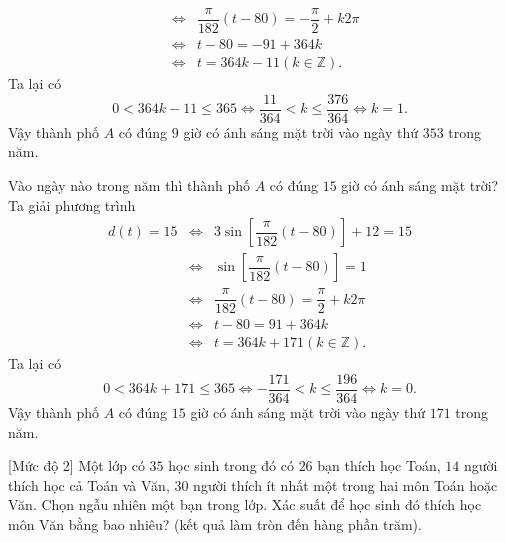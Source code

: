\begin{bt}
{\begin{listEX}[1]
\begin{eqnarray*}
				&\Leftrightarrow& \dfrac{\pi}{182}(t-80) =-\dfrac{\pi}{2}+k2 \pi \\
				&\Leftrightarrow& t-80 = -91+364k\\
				&\Leftrightarrow& t= 364k-11 (k\in \mathbb{Z}).	
			\end{eqnarray*}
			Ta lại có  \[0<364k-11 \le 365 \Leftrightarrow \dfrac{11}{364}<k \le \dfrac{376}{364} \Leftrightarrow k=1.\]
			Vậy thành phố $A$ có đúng $9$ giờ có ánh sáng mặt trời vào ngày thứ $353$ trong năm.
			\item Vào ngày nào trong năm thì thành phố $A$ có đúng $15$ giờ có ánh sáng mặt trời?
			Ta giải phương trình 
			\begin{eqnarray*}
				d(t)=15 &\Leftrightarrow& 3\sin\left[\dfrac{\pi}{182}(t-80)\right] +12=15 \\
				&\Leftrightarrow& \sin\left[\dfrac{\pi}{182}(t-80)\right]=1\\
				&\Leftrightarrow& \dfrac{\pi}{182}(t-80) =\dfrac{\pi}{2}+k2 \pi \\
				&\Leftrightarrow& t-80 = 91+364k\\
				&\Leftrightarrow& t= 364k+171 (k\in \mathbb{Z}).	
			\end{eqnarray*}
			Ta lại có  \[0<364k+171 \le 365 \Leftrightarrow -\dfrac{171}{364}<k \le \dfrac{196}{364} \Leftrightarrow k=0.\]
			Vậy thành phố $A$ có đúng $15$ giờ có ánh sáng mặt trời vào ngày thứ $171$ trong năm.
		\end{listEX}
	}
\end{bt}

\begin{bt}%
[Mức độ 2]%
	Một lớp có $35$ học sinh trong đó có $26$ bạn thích học Toán, $14$ người thích học cả Toán và Văn, $30$ người thích ít nhất một trong hai môn Toán hoặc Văn. Chọn ngẫu nhiên một bạn trong lớp. Xác suất để học sinh đó thích học môn Văn bằng bao nhiêu? (kết quả làm tròn đến hàng phần trăm).
\end{bt}

